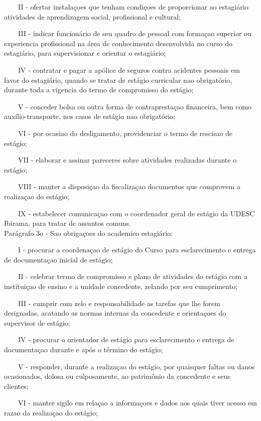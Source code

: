 \documentclass[10pt,a4paper]{article}
\begin{document}
\ \ \ \ II - ofertar instalaçoes que tenham condiçoes de proporcionar ao 
estagiário atividades de aprendizagem social, profissional e cultural;

\ \ \ \ III - indicar funcionário de seu quadro de pessoal com formaçao 
superior ou experiencia profissional na área de conhecimento 
desenvolvida no curso do estagiário, para supervisionar e orientar o 
estagiário;

\ \ \ \ IV - contratar e pagar a apólice de seguros contra acidentes 
pessoais em favor do estagiário, quando se tratar de estágio curricular 
nao obrigatório, durante toda a vigencia do termo de compromisso do 
estágio;

\ \ \ \ V - conceder bolsa ou outra forma de contraprestaçao financeira, 
bem como auxílio-transporte, nos casos de estágio nao obrigatório;

\ \ \ \ VI - por ocasiao do desligamento, providenciar o termo de 
rescisao de estágio;

\ \ \ \ VII - elaborar e assinar pareceres sobre atividades realizadas 
durante o estágio;

\ \ \ \ VIII - manter a disposiçao da fiscalizaçao documentos que 
comprovem a realizaçao do estágio;

\ \ \ \ IX - estabelecer comunicaçao com o coordenador geral de estágio 
da UDESC Ibirama, para tratar de assuntos comuns.
\\

Parágrafo 3o - Sao obrigaçoes do academico estagiário:

\ \ \ \ I - procurar a coordenaçao de estágio do Curso para 
esclarecimento e entrega de documentaçao inicial de estágio;

\ \ \ \ II - celebrar termo de compromisso e plano de atividades do 
estágio com a instituiçao de ensino e a unidade concedente, zelando por 
seu cumprimento;

\ \ \ \ III - cumprir com zelo e responsabilidade as tarefas que lhe 
forem designadas, acatando as normas internas da concedente e 
orientaçoes do supervisor de estágio;

\ \ \ \ IV - procurar o orientador de estágio para esclarecimento e 
entrega de documentaçao durante e após o término do estágio;

\ \ \ \ V - responder, durante a realizaçao do estágio, por quaisquer 
faltas ou danos ocasionados, dolosa ou culposamente, ao patrimônio da 
concedente e seus clientes;

\ \ \ \ VI - manter sigilo em relaçao a informaçoes e dados aos quais 
tiver acesso em razao da realizaçao do estágio;
\end{document}
